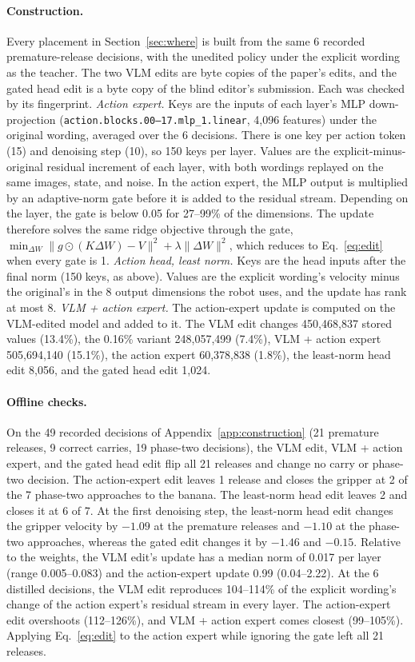 \documentclass{article}
\begin{document}
\paragraph{Construction.} Every placement in Section~\ref{sec:where} is built from the same 6 recorded premature-release decisions, with the unedited policy under the explicit wording as the teacher. The two VLM edits are byte copies of the paper's edits, and the gated head edit is a byte copy of the blind editor's submission. Each was checked by its fingerprint. \emph{Action expert.} Keys are the inputs of each layer's MLP down-projection (\texttt{action.blocks.00--17.mlp\_1.linear}, 4,096 features) under the original wording, averaged over the 6 decisions. There is one key per action token (15) and denoising step (10), so 150 keys per layer. Values are the explicit-minus-original residual increment of each layer, with both wordings replayed on the same images, state, and noise. In the action expert, the MLP output is multiplied by an adaptive-norm gate before it is added to the residual stream. Depending on the layer, the gate is below 0.05 for 27--99\% of the dimensions. The update therefore solves the same ridge objective through the gate, $\min_{\Delta W}\lVert g\odot(K\Delta W)-V\rVert^2+\lambda\lVert\Delta W\rVert^2$, which reduces to Eq.~\eqref{eq:edit} when every gate is 1. \emph{Action head, least norm.} Keys are the head inputs after the final norm (150 keys, as above). Values are the explicit wording's velocity minus the original's in the 8 output dimensions the robot uses, and the update has rank at most 8. \emph{VLM + action expert.} The action-expert update is computed on the VLM-edited model and added to it. The VLM edit changes 450,468,837 stored values (13.4\%), the 0.16\% variant 248,057,499 (7.4\%), VLM + action expert 505,694,140 (15.1\%), the action expert 60,378,838 (1.8\%), the least-norm head edit 8,056, and the gated head edit 1,024.

\paragraph{Offline checks.} On the 49 recorded decisions of Appendix~\ref{app:construction} (21 premature releases, 9 correct carries, 19 phase-two decisions), the VLM edit, VLM + action expert, and the gated head edit flip all 21 releases and change no carry or phase-two decision. The action-expert edit leaves 1 release and closes the gripper at 2 of the 7 phase-two approaches to the banana. The least-norm head edit leaves 2 and closes it at 6 of 7. At the first denoising step, the least-norm head edit changes the gripper velocity by $-1.09$ at the premature releases and $-1.10$ at the phase-two approaches, whereas the gated edit changes it by $-1.46$ and $-0.15$. Relative to the weights, the VLM edit's update has a median norm of 0.017 per layer (range 0.005--0.083) and the action-expert update 0.99 (0.04--2.22). At the 6 distilled decisions, the VLM edit reproduces 104--114\% of the explicit wording's change of the action expert's residual stream in every layer. The action-expert edit overshoots (112--126\%), and VLM + action expert comes closest (99--105\%). Applying Eq.~\eqref{eq:edit} to the action expert while ignoring the gate left all 21 releases.
\end{document}
